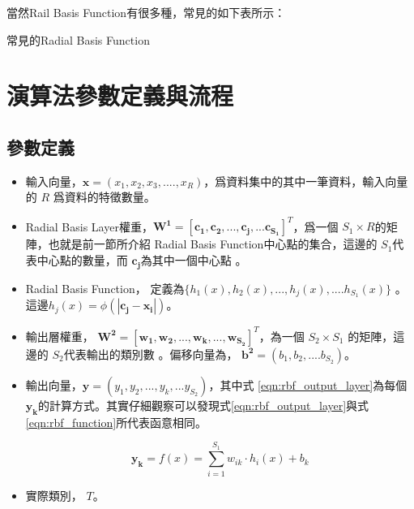 當然Rail Basis Function有很多種，常見的如下表所示：
\\

\begin{table}[h!]
	\centering
	\label{tab:rbf_table}
	
	\caption{常見的Radial Basis Function}
\end{table}






\section{演算法參數定義與流程}




\subsection{參數定義}
\begin{itemize}
	\item
	      輸入向量，\(\mathbf{x} = (x_1,x_2,x_3,....,x_R)\)，爲資料集中的其中一筆資料，輸入向量的 \(R\) 爲資料的特徵數量。
	\item
		Radial Basis Layer權重，\(\mathbf{W^1} = [\mathbf{c_1,c_2,...,c_j,...c_{S_1}}]^T\)，爲一個 \(S_1 \times R \)的矩陣，也就是前一節所介紹 Radial Basis Function中心點的集合，這邊的 \(S_1\)代表中心點的數量，而 \(\mathbf{c_j}\)為其中一個中心點 。
	\item
		Radial Basis Function， 定義為\(\{h_1(x), h_2(x),...,h_j(x),....h_{S_1}(x) \}\)  。
		這邊$h_j(x)=\phi(\mathbf{|c_j-x_i|})$。


	\item
		輸出層權重， \(\mathbf{W^2}= [\mathbf{w_1,w_2,...,w_k,...,w_{S_2}}]^T\)，為一個 \(S_2 \times S_1\) 的矩陣，這邊的 \(S_2\)代表輸出的類別數 。偏移向量為， \(\mathbf{b^2}=(b_1,b_2,....b_{S_2})\)。 
	\item
		輸出向量，\(\mathbf{y}= (y_1,y_2,...,y_k,...y_{S_2})\)，其中式 \ref{eqn:rbf_output_layer}為每個 \(\mathbf{y_k}\)的計算方式。其實仔細觀察可以發現式\ref{eqn:rbf_output_layer}與式\ref{eqn:rbf_function}所代表函意相同。

		\begin{equation}
			\label{eqn:rbf_output_layer}
			\mathbf{y_k}= f(x) = \sum_{i=1}^{S_1}w_{ik}\cdot h_i(x)+b_k
		\end{equation}
		\item
			實際類別， \(T\)。 
\end{itemize}

